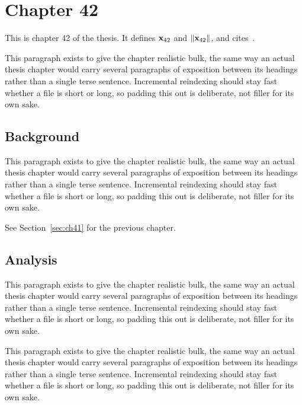 \section{Chapter 42}
\label{sec:ch42}

This is chapter 42 of the thesis. It defines $\mathbf{x}_{42}$ and $\lVert \mathbf{x}_{42} \rVert$, and cites~\cite{ref1}.

This paragraph exists to give the chapter realistic bulk, the same way an actual thesis chapter would carry several paragraphs of exposition between its headings rather than a single terse sentence. Incremental reindexing should stay fast whether a file is short or long, so padding this out is deliberate, not filler for its own sake.

\subsection{Background}
\label{sec:ch42:background}

This paragraph exists to give the chapter realistic bulk, the same way an actual thesis chapter would carry several paragraphs of exposition between its headings rather than a single terse sentence. Incremental reindexing should stay fast whether a file is short or long, so padding this out is deliberate, not filler for its own sake.

See Section~\ref{sec:ch41} for the previous chapter.

\subsection{Analysis}
\label{sec:ch42:analysis}

This paragraph exists to give the chapter realistic bulk, the same way an actual thesis chapter would carry several paragraphs of exposition between its headings rather than a single terse sentence. Incremental reindexing should stay fast whether a file is short or long, so padding this out is deliberate, not filler for its own sake.

This paragraph exists to give the chapter realistic bulk, the same way an actual thesis chapter would carry several paragraphs of exposition between its headings rather than a single terse sentence. Incremental reindexing should stay fast whether a file is short or long, so padding this out is deliberate, not filler for its own sake.
